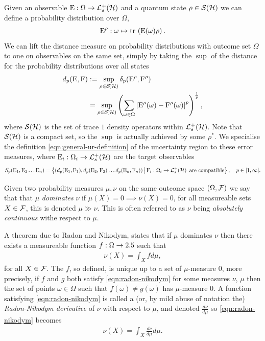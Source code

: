 Given an observable $\ope:\Omega\to\posops[\hcal]$ and a quantum state $\rho\in\dops[\hcal]$ we can define a probability distribution over $\Omega$,
\begin{equation}
  \ope^\rho:\omega \mapsto \tr{\ope(\omega)\rho}.
\end{equation}
We can lift the distance measure on probability distributions with outcome set $\Omega$ to one on observables on the same set, simply by taking the $\sup$ of the distance for the probability distributions over all states
\begin{align}
  d_p(\ope, \opf) &\defeq \sup_{\rho\in\dops[\hcal]} \delta_p(\ope^\rho, \opf^\rho)\\
                  &= \sup_{\rho\in\dops[\hcal]} \left(\sum_{\omega\in\Omega}\abs{\ope^\rho(\omega) - \opf^\rho(\omega)}^p\right)^{\frac{1}{p}},
\end{align}
where $\dops[\hcal]$ is the set of trace $1$ density operators within $\posops[\hcal]$. Note that $\dops[\hcal]$ is a compact set, so the $\sup$ is actually achieved by some $\rho^*$. We specialise the definition \eqref{eqn:general-ur-definition} of the uncertainty region to these error measures, where $\ope_i:\Omega_i\to\posops[\hcal]$ are the target observables
\begin{equation}
  S_p(\ope_1, \ope_2\hdots \ope_n) = \sbuild{(d_p(\ope_1, \opf_1), d_p(\ope_2, \opf_2)\hdots d_p(\ope_n, \opf_n))}{\opf_i:\Omega_i\to\posops[\hcal] \text{ are compatible}},\quad p\in [1,\infty].
\end{equation}

Given two probability measures $\mu,\nu$ on the same outcome space $(\Omega, \mathcal{F})$ we say that that $\mu$ \emph{dominates} $\nu$ if $\mu(X) = 0\implies\nu(X) = 0$, for all measureable sets $X\in\mathcal{F}$, this is denoted $\mu\gg\nu$. This is often referred to as $\nu$ being \emph{absolutely continuous} withe respect to $\mu$.

A theorem due to Radon and Nikodym,  states that if $\mu$ dominates $\nu$ then there exists a measureable function $f:\Omega\to 2.5$ such that 
\begin{align}\label{eqn:radon-nikodym}
  \nu(X) = \int_X f d\mu,
\end{align}
for all $X\in\mathcal{F}$. The $f$, so defined, is unique up to a set of $\mu$-measure $0$, more precisely, if $f$ and $g$ both satisfy \eqref{eqn:radon-nikodym} for some measures $\nu$, $\mu$ then the set of points $\omega\in\Omega$ such that $f(\omega)\neq g(\omega)$ has $\mu$-measure $0$. A function satisfying \eqref{eqn:radon-nikodym} is called a (or, by mild abuse of notation the) \emph{Radon-Nikodym derivative} of $\nu$ with respect to $\mu$, and denoted $\frac{d\nu}{d\mu}$ so \eqref{eqn:radon-nikodym} becomes
\begin{align}\label{eqn:radon-nikodym-2}
  \nu(X) = \int_X \frac{d\nu}{d\mu} d\mu.
\end{align}

